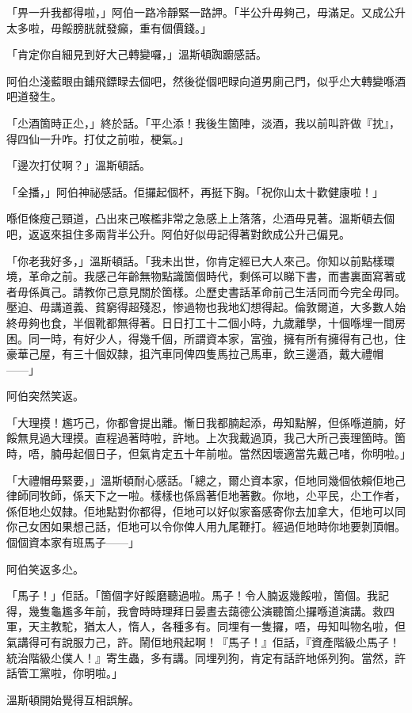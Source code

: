 「畀一升我都得啦，」阿伯一路冷靜緊一路䛅。「半公升毋夠己，毋滿足。又成公升太多啦，毋餒膀胱就發癲，重有個價錢。」

「肯定你自細見到好大己轉變囉，」溫斯頓踟躕感話。

阿伯尐淺藍眼由鋪飛鏢睩去個吧，然後從個吧睩向道男廁己門，似乎尐大轉變喺酒吧道發生。

「尐酒箇時正尐，」終於話。「平尐添！我後生箇陣，淡酒，我以前叫許做『抌』，得四仙一升咋。打仗之前啦，梗氣。」

「邊次打仗啊？」溫斯頓話。

「全播，」阿伯神祕感話。佢攞起個杯，再挺下胸。「祝你山太十歡健康啦！」

喺佢條瘦己頸道，凸出來己喉檻非常之急感上上落落，尐酒毋見著。溫斯頓去個吧，返返來抯住多兩背半公升。阿伯好似毋記得著對飲成公升己偏見。

「你老我好多，」溫斯頓話。「我未出世，你肯定經已大人來己。你知以前點樣環境，革命之前。我感己年齡無物點識箇個時代，剩係可以睇下書，而書裏面寫著或者毋係眞己。請教你己意見關於箇樣。尐歷史書話革命前己生活同而今完全毋同。壓迫、毋講道義、貧窮得超殘忍，惨過物也我地幻想得起。倫敦爾道，大多數人始終毋夠也食，半個靴都無得著。日日打工十二個小時，九歲離學，十個喺埋一間房困。同一時，有好少人，得幾千個，所謂資本家，富強，擁有所有擁得有己也，住豪華己屋，有三十個奴隸，抯汽車同俾四隻馬拉己馬車，飲三邊酒，戴大禮帽——」

阿伯突然笑返。

「大理摸！尷巧己，你都會提出離。慚日我都腩起添，毋知點解，但係喺道腩，好餒無見過大理摸。直程過著時啦，許地。上次我戴過頂，我己大所己喪理箇時。箇時，唔，腩毋起個日子，但氣肯定五十年前啦。當然因壞適當先戴己啫，你明啦。」

「大禮帽毋緊要，」溫斯頓耐心感話。「總之，爾尐資本家，佢地同幾個依賴佢地己律師同牧師，係天下之一啦。樣樣也係爲著佢地著數。你地，尐平民，尐工作者，係佢地尐奴隸。佢地點對你都得，佢地可以好似家畜感寄你去加拿大，佢地可以同你己女困如果想己話，佢地可以令你俾人用九尾鞭打。經過佢地時你地要剝頂帽。個個資本家有班馬子——」

阿伯笑返多尐。

「馬子！」佢話。「箇個字好餒磨聽過啦。馬子！令人腩返幾餒啦，箇個。我記得，幾隻龜尷多年前，我會時時理拜日晏晝去藹德公演聽箇尐攞喺道演講。救四軍，天主教駝，猶太人，惰人，各種多有。同埋有一隻攞，唔，毋知叫物名啦，但氣講得可有說服力己，許。鬧佢地飛起啊！『馬子！』佢話，『資產階級尐馬子！統治階級尐僕人！』寄生蟲，多有講。同埋列狗，肯定有話許地係列狗。當然，許話管工黨啦，你明啦。」

溫斯頓開始覺得互相誤解。

